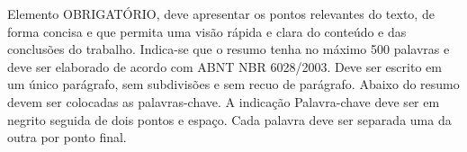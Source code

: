 \documentclass[tcc]{wstex}
\begin{document}
\begin{resumo}

	\noindent Elemento OBRIGATÓRIO, deve apresentar os pontos relevantes do texto,
	de forma concisa e que permita uma visão rápida e clara do conteúdo e das
	conclusões do trabalho. Indica-se que o resumo tenha no máximo 500 palavras e
	deve ser elaborado de acordo com ABNT NBR 6028/2003. Deve ser escrito em um
	único parágrafo, sem subdivisões e sem recuo de parágrafo. Abaixo do resumo
	devem ser colocadas as palavras-chave. A indicação Palavra-chave deve ser
	em negrito seguida de dois pontos e espaço. Cada palavra deve ser separada
	uma da outra por ponto final.

\end{resumo}


\begin{abstract}

	\noindent Version of the abstract in another language for international dissemination. Prepare the abstract in a foreign language accordingly with ABNT NBR 6028/2003. Below the abstract the keywords must be placed. The indication Keywords must be in bold followed by a colon and space. Each word must be separated from each other by a period.

\end{abstract}

\cleardoublepage
\begingroup
\renewcommand*{\addvspace}[1]{} %
\listoffigures
\endgroup
\end{document}
